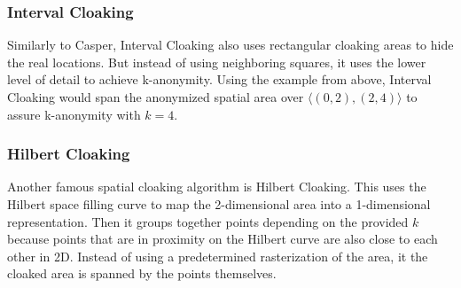 \subsubsection{Interval Cloaking}
Similarly to Casper, Interval Cloaking also uses rectangular cloaking areas to hide the real locations. But instead of using neighboring squares, it uses the lower level of detail to achieve k-anonymity. Using the example from above, Interval Cloaking would span the anonymized spatial area over \(\langle(0,2),(2,4)\rangle\) to assure k-anonymity with \(k=4\).

\subsubsection{Hilbert Cloaking}
Another famous spatial cloaking algorithm is Hilbert Cloaking. This uses the Hilbert space filling curve to map the 2-dimensional area into a 1-dimensional representation. Then it groups together points depending on the provided \(k\) because points that are in proximity on the Hilbert curve are also close to each other in 2D. Instead of using a predetermined rasterization of the area, it the cloaked area is spanned by the points themselves.




